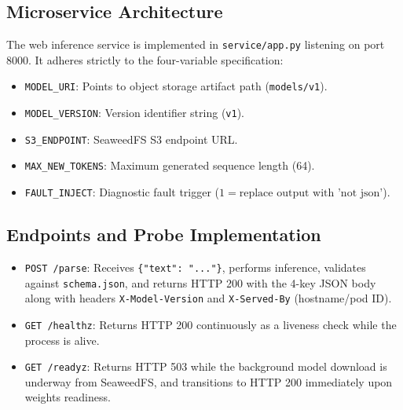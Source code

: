 \documentclass[10pt,a4paper]{article}
\begin{document}
\subsection{Microservice Architecture}
The web inference service is implemented in \texttt{service/app.py} listening on port 8000. It adheres strictly to the four-variable specification:
\begin{itemize}\setlength\itemsep{0em}
    \item \texttt{MODEL\_URI}: Points to object storage artifact path (\texttt{models/v1}).
    \item \texttt{MODEL\_VERSION}: Version identifier string (\texttt{v1}).
    \item \texttt{S3\_ENDPOINT}: SeaweedFS S3 endpoint URL.
    \item \texttt{MAX\_NEW\_TOKENS}: Maximum generated sequence length (64).
    \item \texttt{FAULT\_INJECT}: Diagnostic fault trigger ($1 = \text{replace output with 'not json'}$).
\end{itemize}

\subsection{Endpoints and Probe Implementation}
\begin{itemize}\setlength\itemsep{0em}
    \item \texttt{POST /parse}: Receives \texttt{\{"text": "..."\}}, performs inference, validates against \texttt{schema.json}, and returns HTTP 200 with the 4-key JSON body along with headers \texttt{X-Model-Version} and \texttt{X-Served-By} (hostname/pod ID).
    \item \texttt{GET /healthz}: Returns HTTP 200 continuously as a liveness check while the process is alive.
    \item \texttt{GET /readyz}: Returns HTTP 503 while the background model download is underway from SeaweedFS, and transitions to HTTP 200 immediately upon weights readiness.
\end{itemize}
\end{document}
